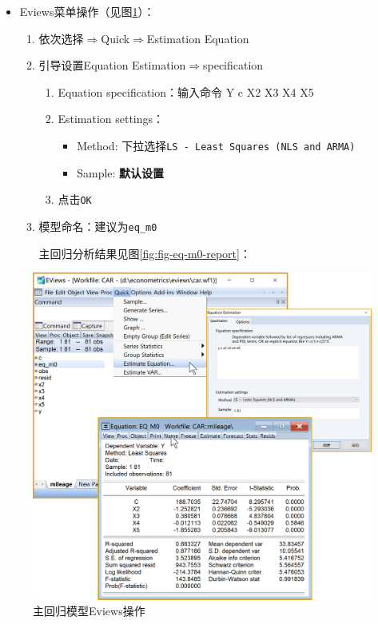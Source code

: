 \documentclass[12pt,(landscape,a4paper),(portrait,a4paper)]{article}
\providecommand{\tightlist}{%
  \setlength{\itemsep}{0pt}\setlength{\parskip}{0pt}}
\begin{document}
\begin{itemize}
\tightlist
\item
  Eviews菜单操作（见图\ref{fig:fig-eq-m0}）：

  \begin{enumerate}
  \def\labelenumi{\arabic{enumi})}
  \item
    依次选择\(\Rightarrow\)Quick\(\Rightarrow\)Estimation Equation\\
  \item
    引导设置Equation Estimation\(\Rightarrow\)specification

    \begin{enumerate}
    \def\labelenumii{\alph{enumii}.}
    \tightlist
    \item
      Equation specification：输入命令 Y c X2 X3 X4 X5
    \item
      Estimation settings：

      \begin{itemize}
      \tightlist
      \item
        Method: 下拉选择\texttt{LS\ -\ Least\ Squares\ (NLS\ and\ ARMA)}
      \item
        Sample: \textbf{默认设置}
      \end{itemize}
    \item
      点击\texttt{OK}\\
    \end{enumerate}
  \item
    模型命名：建议为\texttt{eq\_m0}

    主回归分析结果见图\ref{fig:fig-eq-m0-report}：
  \end{enumerate}
\end{itemize}

\begin{figure}

{\centering \includegraphics[width=28.24in]{picture/lab6-heteroskedasticity/2-eq-m0} 

}

\caption{主回归模型Eviews操作}\label{fig:fig-eq-m0}
\end{figure}
\end{document}
